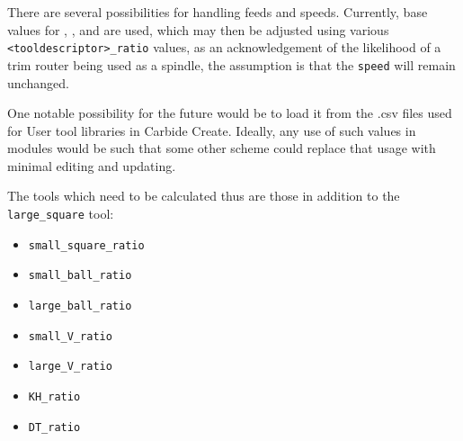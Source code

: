 \documentclass{ltxdoc}
\begin{document}
There are several possibilities for handling feeds and speeds. Currently, base values for , , and  are used, 
which may then be adjusted using various \verb|<tooldescriptor>_ratio| values, as an 
acknowledgement of the likelihood of a trim router being used as a spindle, the
assumption is that the \texttt{speed} will remain unchanged.

One notable possibility for the future would be to load it from the .csv files used for User tool 
libraries in Carbide Create. Ideally, any use of such values in modules would be such that some
other scheme could replace that usage with minimal editing and updating.

The tools which need to be calculated thus are those in addition to the \verb|large_square| tool:

\begin{itemize}
\item \verb|small_square_ratio|
\item \verb|small_ball_ratio|
\item \verb|large_ball_ratio|
\item \verb|small_V_ratio|
\item \verb|large_V_ratio|
\item \verb|KH_ratio|
\item \verb|DT_ratio|
\end{itemize}
\end{document}
